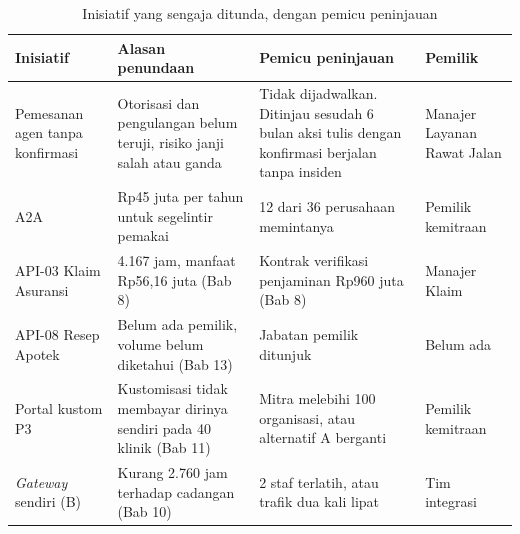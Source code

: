 \begin{table}[!htb]
  \centering
  \caption{Inisiatif yang sengaja ditunda, dengan pemicu peninjauan}
  \label{tab:ch14-ditunda}
  \footnotesize
  \begin{tabularx}{\textwidth}{H{2.2cm}GGH{2.2cm}}
    \hline
    \textbf{Inisiatif} & \textbf{Alasan penundaan} & \textbf{Pemicu peninjauan} & \textbf{Pemilik} \\ \hline
    Pemesanan agen tanpa konfirmasi & Otorisasi dan pengulangan belum teruji, risiko janji salah atau ganda & Tidak dijadwalkan. Ditinjau sesudah 6 bulan aksi tulis dengan konfirmasi berjalan tanpa insiden & Manajer Layanan Rawat Jalan \\ \hline
    A2A & Rp45 juta per tahun untuk segelintir pemakai & 12 dari 36 perusahaan memintanya & Pemilik kemitraan \\ \hline
    API-03 Klaim Asuransi & 4.167 jam, manfaat Rp56,16 juta (Bab 8) & Kontrak verifikasi penjaminan Rp960 juta (Bab 8) & Manajer Klaim \\ \hline
    API-08 Resep Apotek & Belum ada pemilik, volume belum diketahui (Bab 13) & Jabatan pemilik ditunjuk & Belum ada \\ \hline
    Portal kustom P3 & Kustomisasi tidak membayar dirinya sendiri pada 40 klinik (Bab 11) & Mitra melebihi 100 organisasi, atau alternatif A berganti & Pemilik kemitraan \\ \hline
    \textit{Gateway} sendiri (B) & Kurang 2.760 jam terhadap cadangan (Bab 10) & 2 staf terlatih, atau trafik dua kali lipat & Tim integrasi \\ \hline
  \end{tabularx}
\end{table}

